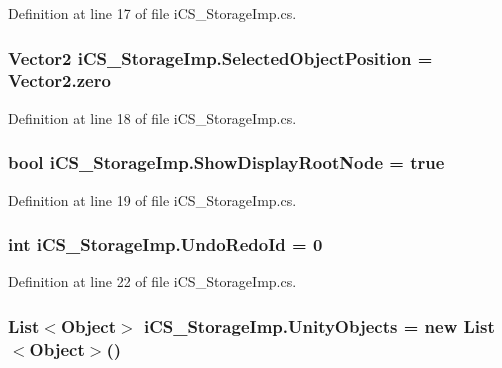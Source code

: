 Definition at line 17 of file i\+C\+S\+\_\+\+Storage\+Imp.\+cs.

\hypertarget{classi_c_s___storage_imp_af3246cbcd84b19800e2afe46fecfec6f}{
\subsubsection[{Selected\+Object\+Position}]{\setlength{\rightskip}{0pt plus 5cm}Vector2 i\+C\+S\+\_\+\+Storage\+Imp.\+Selected\+Object\+Position = Vector2.\+zero}}\label{classi_c_s___storage_imp_af3246cbcd84b19800e2afe46fecfec6f}


Definition at line 18 of file i\+C\+S\+\_\+\+Storage\+Imp.\+cs.

\hypertarget{classi_c_s___storage_imp_aa0a4d92afa22221eca4c8c04cc606174}{
\subsubsection[{Show\+Display\+Root\+Node}]{\setlength{\rightskip}{0pt plus 5cm}bool i\+C\+S\+\_\+\+Storage\+Imp.\+Show\+Display\+Root\+Node = true}}\label{classi_c_s___storage_imp_aa0a4d92afa22221eca4c8c04cc606174}


Definition at line 19 of file i\+C\+S\+\_\+\+Storage\+Imp.\+cs.

\hypertarget{classi_c_s___storage_imp_ae5be71592e9bb544c2c4718ce13cfb3a}{
\subsubsection[{Undo\+Redo\+Id}]{\setlength{\rightskip}{0pt plus 5cm}int i\+C\+S\+\_\+\+Storage\+Imp.\+Undo\+Redo\+Id = 0}}\label{classi_c_s___storage_imp_ae5be71592e9bb544c2c4718ce13cfb3a}


Definition at line 22 of file i\+C\+S\+\_\+\+Storage\+Imp.\+cs.

\hypertarget{classi_c_s___storage_imp_a285e49a4ca85b3feff04b9e75c19c2f4}{
\subsubsection[{Unity\+Objects}]{\setlength{\rightskip}{0pt plus 5cm}List$<${\bf Object}$>$ i\+C\+S\+\_\+\+Storage\+Imp.\+Unity\+Objects = new List$<${\bf Object}$>$()}}\label{classi_c_s___storage_imp_a285e49a4ca85b3feff04b9e75c19c2f4}


